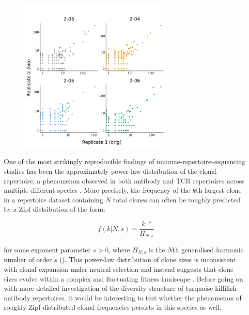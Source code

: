 \begin{figure}
\centering
\includegraphics[width = 0.7\textwidth]{_Figures/png/pilot-clone-sizes-cor-scatter}
\label{fig:igseq-pilot-clone-sizes-cor-scatter}
\end{figure}

One of the most strikingly reproducible findings of immune-repertoire-sequencing studies has been the approximately power-law distribution of the clonal repertoire, a phenomenon observed in both antibody and TCR repertoires across multiple different species \parencite{desponds2016fluctuating,mora2016diversity}. More precisely, the frequency of the $k$th largest clone in a repertoire dataset containing $N$ total clones can often be roughly predicted by a Zipf distribution \parencite{mora2010mentropy} of the form:

\begin{equation}
f(k | N, s) = \frac{k^{-s}}{H_{N,s}}
\end{equation}

\noindent for some exponent parameter $s > 0$, where $H_{N,s}$ is the $N$th generalised harmonic number of order $s$ (). This power-law distribution of clone sizes is inconsistent with clonal expansion under neutral selection and instead suggests that clone sizes evolve within a complex and fluctuating fitness landscape \parencite{desponds2016fluctuating}. Before going on with more detailed investigation of the diversity structure of turquoise killifish antibody repertoires, it would be interesting to test whether the phenomenon of roughly Zipf-distributed clonal frequencies persists in this species as well.


